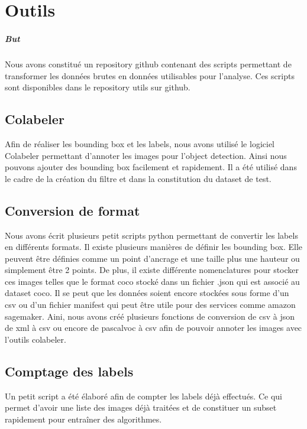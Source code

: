 \chapter{Outils}

\paragraph*{But}

Nous avons constitué un repository github contenant des scripts permettant de transformer les données brutes en données utilisables pour l'analyse. Ces scripts sont disponibles dans le repository utils sur github.

\section{Colabeler}

Afin de réaliser les bounding box et les labels, nous avons utilisé le logiciel Colabeler permettant d'annoter les images pour l'object detection. Ainsi nous pouvons ajouter des bounding box facilement et rapidement. Il a été utilisé dans le cadre de la création du filtre et dans la constitution du dataset de test.

\section{Conversion de format}

Nous avons écrit plusieurs petit scripts python permettant de convertir les labels en différents formats. Il existe plusieurs manières de définir les bounding box. Elle peuvent être définies comme un point d'ancrage et une taille plus une hauteur ou simplement être 2 points. De plus, il existe différente nomenclatures pour stocker ces images telles que le format coco stocké dans un fichier .json qui est associé au dataset coco. Il se peut que les données soient encore stockées sous forme d'un csv ou d'un fichier manifest qui peut être utile pour des services comme amazon sagemaker. Aini, nous avons créé plusieurs fonctions de conversion de csv à json de xml à csv ou encore de pascalvoc à csv afin de pouvoir annoter les images avec l'outils colabeler.

\section{Comptage des labels}

Un petit script a été élaboré afin de compter les labels déjà effectués. Ce qui permet d'avoir une liste des images déjà traitées et de constituer un subset rapidement pour entraîner des algorithmes.

